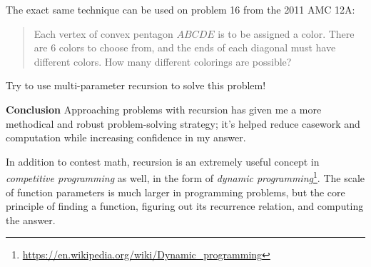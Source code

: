 \documentclass{article}
\begin{document}
The exact same technique can be used on problem 16 from the 2011 AMC 12A:
\begin{quote}
    Each vertex of convex pentagon $ABCDE$ is to be assigned a color. There are $6$ colors to choose from, and the ends of each diagonal must have different colors. How many different colorings are possible?
\end{quote}
Try to use multi-parameter recursion to solve this problem!

\textbf{Conclusion} Approaching problems with recursion has given me a more methodical and robust problem-solving strategy; it's helped reduce casework and computation while increasing confidence in my answer.

In addition to contest math, recursion is an extremely useful concept in \textit{competitive programming} as well, in the form of \textit{dynamic programming}\footnote{\url{https://en.wikipedia.org/wiki/Dynamic\_programming}}. The scale of function parameters is much larger in programming problems, but the core principle of finding a function, figuring out its recurrence relation, and computing the answer.
\end{document}
